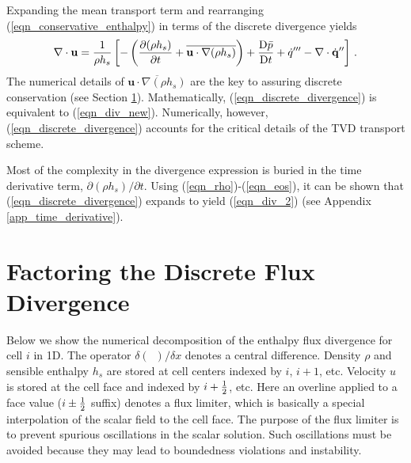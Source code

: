 Expanding the mean transport term and rearranging (\ref{eqn_conservative_enthalpy}) in terms of the discrete divergence yields
\begin{equation}
\label{eqn_discrete_divergence}
\nabla\cdot \mathbf{u} = \frac{1}{\rho h_s}\left[ -\left( \frac{\partial (\rho h_s)}{\partial t} + \overline{\mathbf{u}\cdot\nabla(\rho h_s)} \right) + \frac{\mbox{D} \bar{p}}{\mbox{D} t} + \dot{q}^{\prime\prime\prime} - \nabla\cdot \dot{\mathbf{q}}^{\prime\prime} \right] \,\mbox{.}
\end{equation}
The numerical details of $\overline{\mathbf{u}\cdot\nabla(\rho h_s)}$ are the key to assuring discrete conservation (see Section \ref{app_transport_decomposition}). Mathematically, (\ref{eqn_discrete_divergence}) is  equivalent to (\ref{eqn_div_new}). Numerically, however, (\ref{eqn_discrete_divergence}) accounts for the critical details of the TVD transport scheme.

Most of the complexity in the divergence expression is buried in the time derivative term, $\partial (\rho h_s)/\partial t$.  Using (\ref{eqn_rho})-(\ref{eqn_eos}), it can be shown that (\ref{eqn_discrete_divergence}) expands to yield (\ref{eqn_div_2}) (see Appendix \ref{app_time_derivative}).


\section{Factoring the Discrete Flux Divergence}
\label{app_transport_decomposition}

Below we show the numerical decomposition of the enthalpy flux divergence for cell $i$ in 1D.  The operator $\delta(\,\,\,)/\delta x$ denotes a central difference.  Density $\rho$ and sensible enthalpy $h_s$ are stored at cell centers indexed by $i$, $i+1$, etc.  Velocity $u$ is stored at the cell face and indexed by $i+\mbox{$\frac{1}{2}$}$, etc.  Here an overline applied to a face value ($i\pm\mbox{$\frac{1}{2}$}$ suffix) denotes a flux limiter, which is basically a special interpolation of the scalar field to the cell face.  The purpose of the flux limiter is to prevent spurious oscillations in the scalar solution.  Such oscillations must be avoided because they may lead to boundedness violations and instability.

